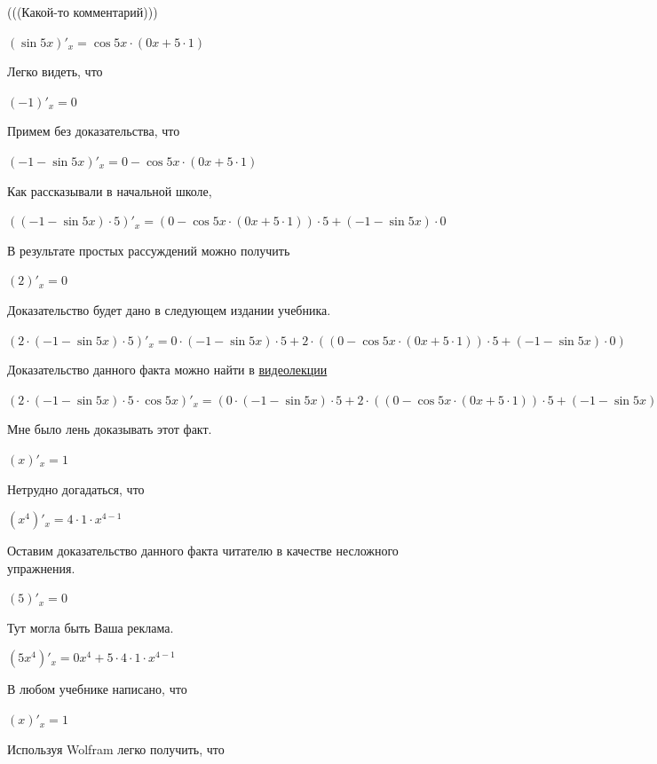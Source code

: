 \documentclass[12pt,a4paper,fleqn]{article}
\theoremstyle{definition}
\begin{document}
(((Какой-то комментарий))) 

$(\sin 5  x )'_{x} = \cos 5  x  \cdot ( 0  x  +  5  \cdot  1 )$

Легко видеть, что 

$( -1 )'_{x} =  0 $

Примем без доказательства, что 

$( -1  - \sin 5  x )'_{x} =  0  - \cos 5  x  \cdot ( 0  x  +  5  \cdot  1 )$

Как рассказывали в начальной школе, 

$(( -1  - \sin 5  x ) \cdot  5 )'_{x} = ( 0  - \cos 5  x  \cdot ( 0  x  +  5  \cdot  1 )) \cdot  5  + ( -1  - \sin 5  x ) \cdot  0 $

В результате простых рассуждений можно получить 

$( 2 )'_{x} =  0 $

Доказательство будет дано в следующем издании учебника. 

$( 2  \cdot ( -1  - \sin 5  x ) \cdot  5 )'_{x} =  0  \cdot ( -1  - \sin 5  x ) \cdot  5  +  2  \cdot (( 0  - \cos 5  x  \cdot ( 0  x  +  5  \cdot  1 )) \cdot  5  + ( -1  - \sin 5  x ) \cdot  0 )$

Доказательство данного факта можно найти в \href{https://www.youtube.com/watch?v=dQw4w9WgXcQ}{видеолекции} 

$( 2  \cdot ( -1  - \sin 5  x ) \cdot  5  \cdot \cos 5  x )'_{x} = ( 0  \cdot ( -1  - \sin 5  x ) \cdot  5  +  2  \cdot (( 0  - \cos 5  x  \cdot ( 0  x  +  5  \cdot  1 )) \cdot  5  + ( -1  - \sin 5  x ) \cdot  0 )) \cdot \cos 5  x  +  2  \cdot ( -1  - \sin 5  x ) \cdot  5  \cdot ( -1  - \sin 5  x ) \cdot ( 0  x  +  5  \cdot  1 )$

Мне было лень доказывать этот факт.

$( x )'_{x} =  1 $

Нетрудно догадаться, что 

$({ x }^{ 4 })'_{x} =  4  \cdot  1  \cdot { x }^{ 4  -  1 }$

Оставим доказательство данного факта читателю в качестве несложного упражнения. 

$( 5 )'_{x} =  0 $

Тут могла быть Ваша реклама. 

$( 5 { x }^{ 4 })'_{x} =  0 { x }^{ 4 } +  5  \cdot  4  \cdot  1  \cdot { x }^{ 4  -  1 }$

В любом учебнике написано, что 

$( x )'_{x} =  1 $

Используя Wolfram легко получить, что 
\end{document}
